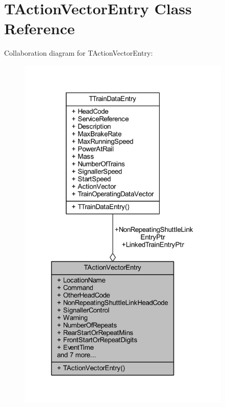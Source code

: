 \hypertarget{class_t_action_vector_entry}{}\section{T\+Action\+Vector\+Entry Class Reference}
\label{class_t_action_vector_entry}


Collaboration diagram for T\+Action\+Vector\+Entry\+:\nopagebreak
\begin{figure}[H]
\begin{center}
\leavevmode
\includegraphics[width=289pt]{class_t_action_vector_entry__coll__graph}
\end{center}
\end{figure}

